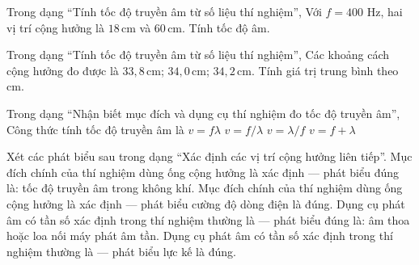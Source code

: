 \begin{ex}
Trong dạng “Tính tốc độ truyền âm từ số liệu thí nghiệm”, Với $f=400$ Hz, hai vị trí cộng hưởng là $18\,\text{cm}$ và $60\,\text{cm}$. Tính tốc độ âm.
\choiceTF

\end{ex}

\begin{ex}
Trong dạng “Tính tốc độ truyền âm từ số liệu thí nghiệm”, Các khoảng cách cộng hưởng đo được là $33,8\,\text{cm}$; $34,0\,\text{cm}$; $34,2\,\text{cm}$. Tính giá trị trung bình theo cm.
\end{ex}

\begin{ex}
Trong dạng “Nhận biết mục đích và dụng cụ thí nghiệm đo tốc độ truyền âm”, Công thức tính tốc độ truyền âm là
\choice
{\True $v=f\lambda$}
{$v=f/\lambda$}
{$v=\lambda/f$}
{$v=f+\lambda$}
\end{ex}

\begin{ex}
Xét các phát biểu sau trong dạng “Xác định các vị trí cộng hưởng liên tiếp”.
\choiceTF
{\True Mục đích chính của thí nghiệm dùng ống cộng hưởng là xác định — phát biểu đúng là: tốc độ truyền âm trong không khí.}
{Mục đích chính của thí nghiệm dùng ống cộng hưởng là xác định — phát biểu cường độ dòng điện là đúng.}
{\True Dụng cụ phát âm có tần số xác định trong thí nghiệm thường là — phát biểu đúng là: âm thoa hoặc loa nối máy phát âm tần.}
{Dụng cụ phát âm có tần số xác định trong thí nghiệm thường là — phát biểu lực kế là đúng.}
\end{ex}

